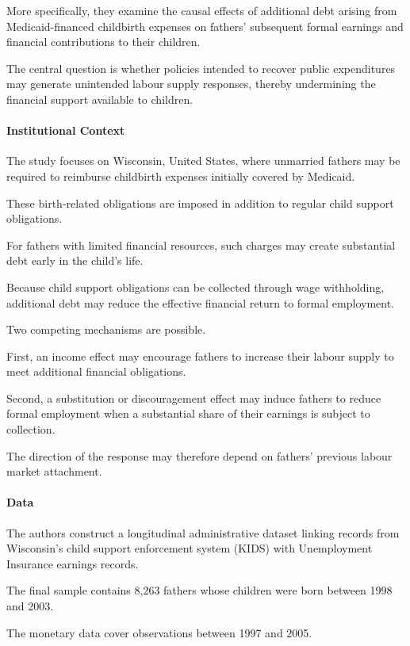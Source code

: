 \documentclass{article}
\begin{document}
More specifically, they examine the causal effects of
additional debt arising from Medicaid-financed childbirth
expenses on fathers' subsequent formal earnings and
financial contributions to their children.

The central question is whether policies intended to
recover public expenditures may generate unintended
labour supply responses, thereby undermining the
financial support available to children.

\paragraph{Institutional Context}

The study focuses on Wisconsin, United States,
where unmarried fathers may be required to reimburse
childbirth expenses initially covered by Medicaid.

These birth-related obligations are imposed in addition
to regular child support obligations.

For fathers with limited financial resources, such
charges may create substantial debt early in the
child's life.

Because child support obligations can be collected
through wage withholding, additional debt may reduce
the effective financial return to formal employment.

Two competing mechanisms are possible.

First, an income effect may encourage fathers to
increase their labour supply to meet additional
financial obligations.

Second, a substitution or discouragement effect
may induce fathers to reduce formal employment
when a substantial share of their earnings is
subject to collection.

The direction of the response may therefore depend
on fathers' previous labour market attachment.

\paragraph{Data}

The authors construct a longitudinal administrative
dataset linking records from Wisconsin's child
support enforcement system (KIDS) with
Unemployment Insurance earnings records.

The final sample contains 8,263 fathers whose
children were born between 1998 and 2003.

The monetary data cover observations between
1997 and 2005.
\end{document}

